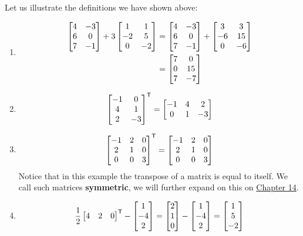 \begin{example}
Let us illustrate the definitions we have shown above:
\begin{enumerate}
    \item \begin{align*}
        \begin{bmatrix} 4 & -3 \\ 6 & 0 \\ 7 & -1 \end{bmatrix} + 3\begin{bmatrix} 1 & 1 \\ -2 & 5 \\ 0 & -2 \end{bmatrix} &= \begin{bmatrix} 4 & -3 \\ 6 & 0 \\ 7 & -1 \end{bmatrix} + \begin{bmatrix} 3 & 3 \\ -6 & 15 \\ 0 & -6 \end{bmatrix} \\
        & = \begin{bmatrix} 7 & 0 \\ 0 & 15 \\ 7 & -7 \end{bmatrix}
    \end{align*}
    \item $$\begin{bmatrix} -1 & 0 \\ 4 & 1 \\ 2 & -3 \end{bmatrix}^{\mathsf{T}} = \begin{bmatrix} -1 & 4 & 2 \\ 0 & 1 & -3 \end{bmatrix}$$
    \item $$\begin{bmatrix} -1 & 2 & 0 \\ 2 & 1 & 0 \\ 0 &  0 & 3 \end{bmatrix}^{\mathsf{T}} = \begin{bmatrix} -1 & 2 & 0 \\ 2 & 1 & 0 \\ 0 & 0 & 3 \end{bmatrix}$$
    Notice that in this example the transpose of a matrix is equal to itself. We call such matrices \textbf{symmetric}, we will further expand on this on \hyperref[def:14.4]{Chapter 14}.
    \item $$\frac{1}{2}\begin{bmatrix} 4 & 2 & 0 \end{bmatrix}^{\mathsf{T}} - \begin{bmatrix} 1 \\ -4 \\ 2 \end{bmatrix} = \begin{bmatrix} 2 \\ 1 \\ 0 \end{bmatrix} - \begin{bmatrix} 1 \\ -4 \\ 2 \end{bmatrix} = \begin{bmatrix} 1 \\ 5 \\ -2 \end{bmatrix}$$
\end{enumerate}
\end{example}

